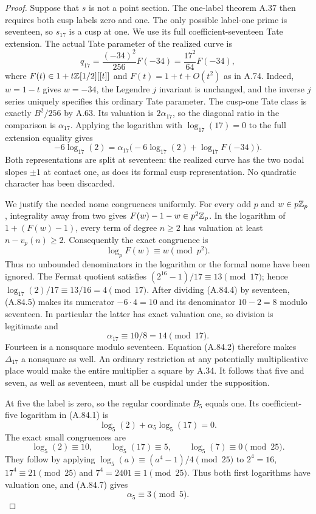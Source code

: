 \begin{proof}
Suppose that $s$ is not a point section.
The one-label theorem A.37 then requires both cusp
labels zero and one.  The only possible label-one
prime is seventeen, so $s_{17}$ is a cusp at one.
We use its full coefficient-seventeen Tate extension.
The actual Tate parameter of the realized curve is
\[
              q_{17}=\frac{(-34)^2}{256}F(-34)
                       =\frac{17^2}{64}F(-34),
\tag{A.84.3}
\]
where $F(t)\in1+t\mathbb Z[1/2][[t]]$ and
$F(t)=1+t+O(t^2)$ as in A.74.
Indeed, $w=1-t$ gives $w=-34$, the Legendre $j$ invariant
is unchanged, and the inverse $j$ series uniquely
specifies this ordinary Tate parameter.
The cusp-one Tate class is exactly $B^2/256$ by A.63.
Its valuation is $2\alpha_{17}$, so the diagonal ratio
in the comparison is $\alpha_{17}$.
Applying the logarithm with $\log_{17}(17)=0$ to the
full extension equality gives
\[
 -6\log_{17}(2)
      =\alpha_{17}
          \bigl(-6\log_{17}(2)+\log_{17}F(-34)\bigr).
\tag{A.84.4}
\]
Both representations are split at seventeen: the
realized curve has the two nodal slopes $\pm1$ at
contact one, as does its formal cusp representation.
No quadratic character has been discarded.

We justify the needed nome congruences uniformly.
For every odd $p$ and $w\in p\mathbb Z_p$, integrality away
from two gives $F(w)-1-w\in p^2\mathbb Z_p$.
In the logarithm of $1+(F(w)-1)$, every term of
degree $n\ge2$ has valuation at least
$n-v_p(n)\ge2$.
Consequently the exact congruence is
\[
                         \log_p F(w)\equiv w\pmod{p^2}.
\tag{A.84.5}
\]
Thus no unbounded denominators in the logarithm or
the formal nome have been ignored.
The Fermat quotient satisfies
$(2^{16}-1)/17\equiv13\pmod{17}$; hence
$\log_{17}(2)/17\equiv13/16=4\pmod{17}$.
After dividing (A.84.4) by seventeen, (A.84.5) makes
its numerator $-6\cdot4=10$ and its denominator
$10-2=8$ modulo seventeen.  In particular the latter
has exact valuation one, so division is legitimate and
\[
                           \alpha_{17}\equiv10/8=14
                                            \pmod{17}.
\tag{A.84.6}
\]
Fourteen is a nonsquare modulo seventeen.
Equation (A.84.2) therefore makes $\Delta_{17}$ a
nonsquare as well.
An ordinary restriction at any potentially multiplicative
place would make the entire multiplier a square by
A.34.  It follows that five and seven, as well as
seventeen, must all be cuspidal under the supposition.

At five the label is zero, so the regular coordinate
$B_5$ equals one.  Its coefficient-five logarithm in
(A.84.1) is
\[
                 \log_5(2)+\alpha_5\log_5(17)=0.
\tag{A.84.7}
\]
The exact small congruences are
\[
       \log_5(2)\equiv10,\qquad
       \log_5(17)\equiv5,\qquad
       \log_5(7)\equiv0\pmod{25}.
\tag{A.84.8}
\]
They follow by applying
$\log_5(a)\equiv(a^4-1)/4\pmod{25}$ to
$2^4=16$, $17^4\equiv21\pmod{25}$ and
$7^4=2401\equiv1\pmod{25}$.
Thus both first logarithms have valuation one, and
(A.84.7) gives
\[
                                    \alpha_5\equiv3\pmod5.
\tag{A.84.9}
\]


\end{proof}
